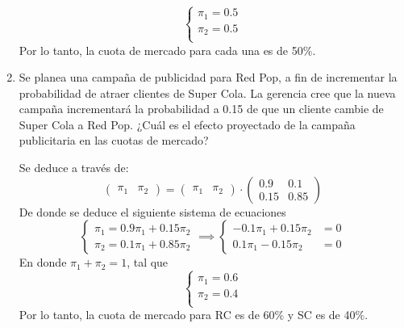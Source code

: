 \begin{problema}
\begin{enumerate}
\begin{sol}
$$\begin{cases}
	\pi_1 = 0.5\\
	\pi_2 = 0.5\\
\end{cases}$$
Por lo tanto, la cuota de mercado para cada una es de 50\%. 
	\end{sol}
	\item Se planea una campaña de publicidad para Red Pop, a fin de incrementar la probabilidad de atraer clientes de Super
	Cola. La gerencia cree que la nueva campaña incrementará la probabilidad a 0.15 de que un cliente cambie de Super
	Cola a Red Pop. ¿Cuál es el efecto proyectado de la campaña publicitaria en las cuotas de mercado?
	\begin{sol}
		Se deduce a través de: 
		$$\begin{pmatrix}
			\pi_1 & \pi_2 
		\end{pmatrix} =\begin{pmatrix}
			\pi_1 & \pi_2 
		\end{pmatrix} \cdot \begin{pmatrix}
			0.9 & 0.1\\
			0.15 & 0.85
		\end{pmatrix}$$
		De donde se deduce el siguiente sistema de ecuaciones 
		$$ \begin{cases}
			\pi_1 = 0.9\pi_1 +0.15 \pi_2\\
			\pi_2 = 0.1 \pi_1+ 0.85\pi_2
		\end{cases} \implies \begin{cases}
			-0.1\pi_1 +0.15\pi_2&=0\\
			0.1\pi_1 -0.15\pi_2 &=0
		\end{cases}  $$
		En donde $\pi_1+\pi_2=1$, tal que 
		$$\begin{cases}
			\pi_1 = 0.6\\
			\pi_2 = 0.4\\
		\end{cases}$$
		Por lo tanto, la cuota de mercado para RC es de 60\% y SC es de 40\%.   
	\end{sol}
\end{enumerate}
\end{problema}

